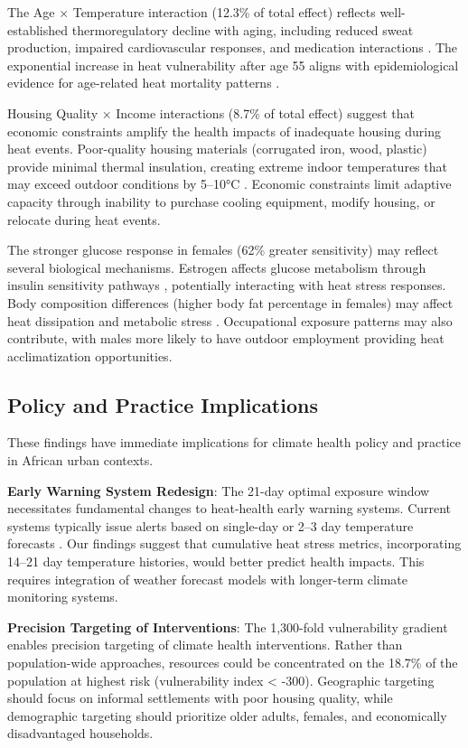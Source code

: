 \documentclass[journal,article,submit,pdftex,moreauthors]{Definitions/mdpi}
\begin{document}
The Age × Temperature interaction (12.3\% of total effect) reflects well-established thermoregulatory decline with aging, including reduced sweat production, impaired cardiovascular responses, and medication interactions \cite{kenny2010heat}. The exponential increase in heat vulnerability after age 55 aligns with epidemiological evidence for age-related heat mortality patterns \cite{basu2014relation}.

Housing Quality × Income interactions (8.7\% of total effect) suggest that economic constraints amplify the health impacts of inadequate housing during heat events. Poor-quality housing materials (corrugated iron, wood, plastic) provide minimal thermal insulation, creating extreme indoor temperatures that may exceed outdoor conditions by 5--10°C \cite{wright2005time}. Economic constraints limit adaptive capacity through inability to purchase cooling equipment, modify housing, or relocate during heat events.

The stronger glucose response in females (62\% greater sensitivity) may reflect several biological mechanisms. Estrogen affects glucose metabolism through insulin sensitivity pathways \cite{mauvais2010estrogen}, potentially interacting with heat stress responses. Body composition differences (higher body fat percentage in females) may affect heat dissipation and metabolic stress \cite{shapiro1980thermoregulatory}. Occupational exposure patterns may also contribute, with males more likely to have outdoor employment providing heat acclimatization opportunities.

\subsection{Policy and Practice Implications}

These findings have immediate implications for climate health policy and practice in African urban contexts.

\textbf{Early Warning System Redesign}: The 21-day optimal exposure window necessitates fundamental changes to heat-health early warning systems. Current systems typically issue alerts based on single-day or 2--3 day temperature forecasts \cite{lowe2011heatwave}. Our findings suggest that cumulative heat stress metrics, incorporating 14--21 day temperature histories, would better predict health impacts. This requires integration of weather forecast models with longer-term climate monitoring systems.

\textbf{Precision Targeting of Interventions}: The 1,300-fold vulnerability gradient enables precision targeting of climate health interventions. Rather than population-wide approaches, resources could be concentrated on the 18.7\% of the population at highest risk (vulnerability index < -300). Geographic targeting should focus on informal settlements with poor housing quality, while demographic targeting should prioritize older adults, females, and economically disadvantaged households.
\end{document}
